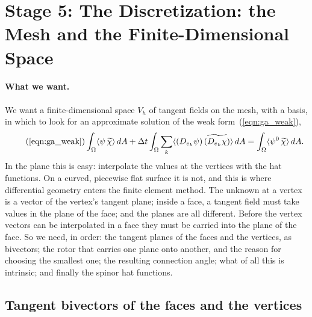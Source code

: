 \section{Stage 5: The Discretization: the Mesh and the Finite-Dimensional Space}
\label{section:ga_fem}

\paragraph{What we want.} We want a finite-dimensional space $V_h$ of tangent fields on the mesh, with a basis, in which to look for an approximate solution of the weak form~(\ref{eqn:ga_weak}),
\begin{equation*}
\tag{\ref{eqn:ga_weak}}
\int_\Omega \langle \psi\, \widetilde\chi \rangle\, dA + \Delta t \int_\Omega \sum_k \langle (D_{e_k} \psi)\, \widetilde{(D_{e_k} \chi)} \rangle\, dA = \int_\Omega \langle \psi^0\, \widetilde\chi \rangle\, dA .
\end{equation*}
In the plane this is easy: interpolate the values at the vertices with the hat functions. On a curved, piecewise flat surface it is not, and this is where differential geometry enters the finite element method. The unknown at a vertex is a vector of the vertex's tangent plane; inside a face, a tangent field must take values in the plane of the face; and the planes are all different. Before the vertex vectors can be interpolated in a face they must be carried into the plane of the face. So we need, in order: the tangent planes of the faces and the vertices, as bivectors; the rotor that carries one plane onto another, and the reason for choosing the smallest one; the resulting connection angle; what of all this is intrinsic; and finally the spinor hat functions.

\subsection{Tangent bivectors of the faces and the vertices}

